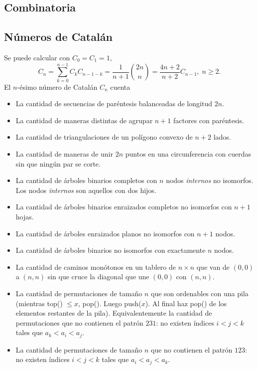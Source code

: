 \documentclass[10pt,spanish,mexico]{article}
\numberwithin{equation}{section}
\begin{document}
\begin{multicols}{2}
\vspace{-1.2\baselineskip}
\hrulefill
\section{Combinatoria}
\subsection{Números de Catalán}

Se puede calcular con $C_0 = C_1 = 1$,
$$C_n = \sum_{k = 0}^{n - 1} C_kC_{n - 1 - k} = \frac{1}{n + 1}\binom{2n}{n} = \frac{4n + 2}{n + 2}C_{n - 1},\; n \geq 2.$$
El $n$-ésimo número de Catalán $C_n$ cuenta
\begin{itemize}
    \item La cantidad de secuencias de paréntesis balanceadas de longitud $2n$.
    \item La cantidad de maneras distintas de agrupar $n + 1$ factores con paréntesis.
    \item La cantidad de triangulaciones de un polígono convexo de $n + 2$ lados.
    \item La cantidad de maneras de unir $2n$ puntos en una circunferencia con cuerdas sin que ningún par se corte.
    \item La cantidad de árboles binarios completos con $n$ nodos \textit{internos} no isomorfos. Los nodos \textit{internos} son aquellos con dos hijos.
    \item La cantidad de árboles binarios enraizados completos no isomorfos con $n + 1$ hojas.
    \item La cantidad de árboles enraizados planos no isomorfos con $n + 1$ nodos.
    \item La cantidad de árboles binarios no isomorfos con exactamente $n$ nodos.
    \item La cantidad de caminos monótonos en un tablero de $n \times n$ que van de $(0, 0)$ a $(n, n)$ sin que cruce la diagonal que une $(0, 0)$ con $(n, n)$.
    \item La cantidad de permutaciones de tamaño $n$ que son ordenables con una pila (mientras top() $\leq x$, pop(). Luego push($x$). Al final haz pop() de los elementos restantes de la pila). Equivalentemente la cantidad de permutaciones que no contienen el patrón $231$: no existen índices $i < j < k$ tales que $a_k < a_i < a_j$.
    \item La cantidad de permutaciones de tamaño $n$ que no contienen el patrón $123$: no existen índices $i < j < k$ tales que $a_i < a_j < a_k$.

\end{itemize}
\end{multicols}
\end{document}
